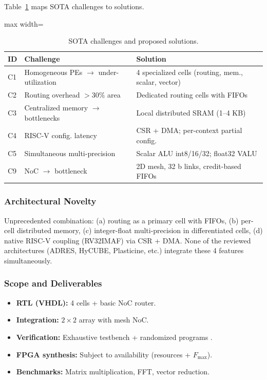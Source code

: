 \documentclass[conference]{IEEEtran}
\begin{document}
Table~\ref{tab:desafios_soluciones} maps SOTA challenges to solutions.

\begin{table}[htbp]
\centering
\caption{SOTA challenges and proposed solutions.}
\label{tab:desafios_soluciones}
\normalsize
\begin{adjustbox}{max width=\columnwidth}
\begin{tabular}{@{}p{}p{}p{}@{}}
	\textbf{ID} & \textbf{Challenge} & \textbf{Solution} \\
\midrule
C1 & Homogeneous PEs $\to$ under-utilization & 4 specialized cells (routing, mem., scalar, vector) \\
C2 & Routing overhead $>30\%$ area & Dedicated routing cells with FIFOs \\
C3 & Centralized memory $\to$ bottlenecks & Local distributed SRAM (1--4 KB) \\
C4 & RISC-V config. latency & CSR + DMA; per-context partial config. \\
C5 & Simultaneous multi-precision & Scalar ALU int8/16/32; float32 VALU \\
C9 & NoC $\to$ bottleneck & 2D mesh, 32 b links, credit-based FIFOs \\
\bottomrule
\end{tabular}
\end{adjustbox}
\end{table}

\subsubsection{Architectural Novelty}
Unprecedented combination: (a) routing as a primary cell with FIFOs, (b) per-cell distributed memory, (c) integer-float multi-precision in differentiated cells, (d) native RISC-V coupling (RV32IMAF) via CSR + DMA. None of the reviewed architectures (ADRES, HyCUBE, Plasticine, etc.) integrate these 4 features simultaneously.

\subsubsection{Scope and Deliverables}
\begin{itemize}
    \item \textbf{RTL (VHDL):} 4 cells + basic NoC router.
    \item \textbf{Integration:} $2\times2$ array with mesh NoC.
    \item \textbf{Verification:} Exhaustive testbench + randomized programs \cite{verification_cgra}.
    \item \textbf{FPGA synthesis:} Subject to availability (resources + $F_{\max}$).
    \item \textbf{Benchmarks:} Matrix multiplication, FFT, vector reduction.
\end{itemize}
\end{document}
